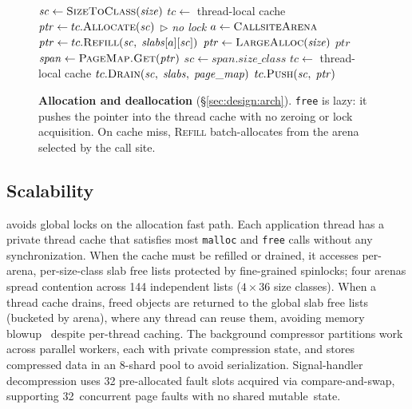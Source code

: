 \begin{figure}[t]
\begin{algorithmic}[1]
  \State $\mathit{sc} \gets \Call{SizeToClass}{\mathit{size}}$
  \State $\mathit{tc} \gets$ thread-local cache
    \State $\mathit{ptr} \gets tc.\Call{Allocate}{\mathit{sc}}$
    $\triangleright$ \textit{no lock}
      \State $a \gets \Call{CallsiteArena}{}$
      \State $\mathit{ptr} \gets tc.\Call{Refill}{\mathit{sc},\; \mathit{slabs}[a][\mathit{sc}]}$
    \EndIf
  \Else
    \State $\mathit{ptr} \gets \Call{LargeAlloc}{\mathit{size}}$
  \EndIf
  \State \Return $\mathit{ptr}$
\EndFunction
\Statex
{}
  \State $\mathit{span} \gets \Call{PageMap.Get}{\mathit{ptr}}$
  \State $\mathit{sc} \gets \mathit{span}.\mathit{size\_class}$
  \State $\mathit{tc} \gets$ thread-local cache
    \State $tc.\Call{Drain}{\mathit{sc},\; \mathit{slabs},\; \mathit{page\_map}}$
  \EndIf
  \State $tc.\Call{Push}{\mathit{sc},\; \mathit{ptr}}$
\EndFunction
\end{algorithmic}
\caption{\textbf{Allocation and deallocation}
  (\S\ref{sec:design:arch}).  \texttt{free} is lazy: it pushes the
  pointer into the thread cache with no zeroing or lock acquisition.
  On cache miss, \textsc{Refill} batch-allocates from the arena
  selected by the call site.}
\label{fig:algo:malloc}
\end{figure}

\subsection{Scalability}
\label{sec:design:scalability}

\sys avoids global locks on the allocation fast path.  Each
application thread has a private thread cache that satisfies most
\texttt{malloc} and \texttt{free} calls without any synchronization.
When the cache must be refilled or drained, it accesses per-arena,
per-size-class slab free lists protected by fine-grained spinlocks;
four arenas spread contention across 144 independent lists ($4 \times
36$ size classes).  When a thread cache drains, freed objects are
returned to the global slab free lists (bucketed by arena), where any
thread can reuse them, avoiding memory
blowup~\cite{berger2000hoard} despite per-thread caching.  The
background compressor partitions work across parallel workers, each
with private compression state, and stores compressed data in an
8-shard pool to avoid serialization.  Signal-handler decompression
uses 32 pre-allocated fault slots acquired via compare-and-swap,
supporting 32~concurrent page faults with no shared mutable~state.

